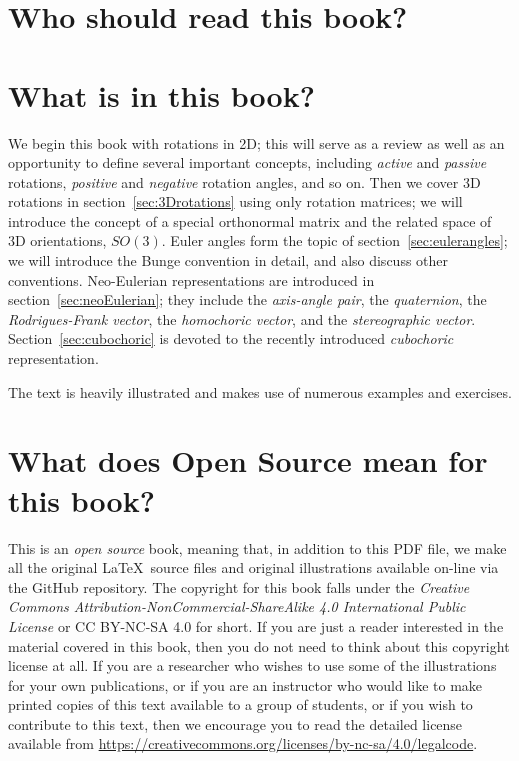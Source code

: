  
\section*{Who should read this book?}



\section*{What is in this book?}
We begin this book with rotations in 2D; this will serve as a review as well as an opportunity to define several important concepts, including \textit{active} and \textit{passive} rotations, \textit{positive} and \textit{negative} rotation angles, and so on.  Then we cover 3D rotations in section~\ref{sec:3Drotations} using only rotation matrices; we will introduce the concept of a special orthonormal matrix and the related space of 3D orientations, $SO(3)$.  Euler angles form the topic of section~\ref{sec:eulerangles}; we will introduce the Bunge convention in detail, and also discuss other conventions.  Neo-Eulerian representations are introduced in section~\ref{sec:neoEulerian}; they include the \textit{axis-angle pair}, the \textit{quaternion}, the \textit{Rodrigues-Frank vector}, the \textit{homochoric vector}, and the \textit{stereographic vector}.  Section~\ref{sec:cubochoric} is devoted to the recently introduced \textit{cubochoric} representation.



The text is heavily illustrated and makes use of numerous examples and exercises.  





\section*{What does Open Source mean for this book?}
This is an \textit{open source} book, meaning that, in addition to this PDF file, we make all the original \LaTeX\ source files and original illustrations available on-line via the GitHub repository.  The copyright for this book falls under the \textit{Creative Commons Attribution-NonCommercial-ShareAlike 4.0 International Public License} or CC BY-NC-SA 4.0 for short.  If you are just a reader interested in the material covered in this book, then you do not need to think about this copyright license at all.  If you are a researcher who wishes to use some of the illustrations for your own publications, or if you are an instructor who would like to make printed copies of this text available to a group of students, or if you wish to contribute to this text, then we encourage you to read the detailed license available from \url{https://creativecommons.org/licenses/by-nc-sa/4.0/legalcode}. 

